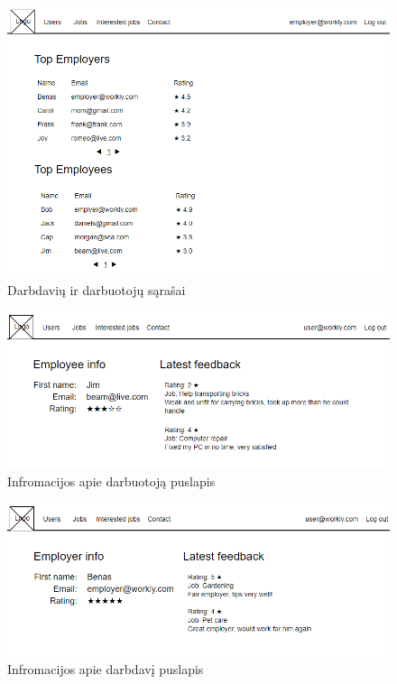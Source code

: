 \documentclass{VUMIFPSkursinis}
\begin{document}
\begin{figure}[H]
\centering
\includegraphics[width=\linewidth, frame]{img/top.png}
\caption{Darbdavių ir darbuotojų sąrašai}
\end{figure}

\begin{figure}[H]
\centering
\includegraphics[width=\linewidth, frame]{img/employeeInfo.png}
\caption{Infromacijos apie darbuotoją puslapis}
\end{figure}

\begin{figure}[H]
\centering
\includegraphics[width=\linewidth, frame]{img/employerInfo.png}
\caption{Infromacijos apie darbdavį puslapis}
\end{figure}
\end{document}
